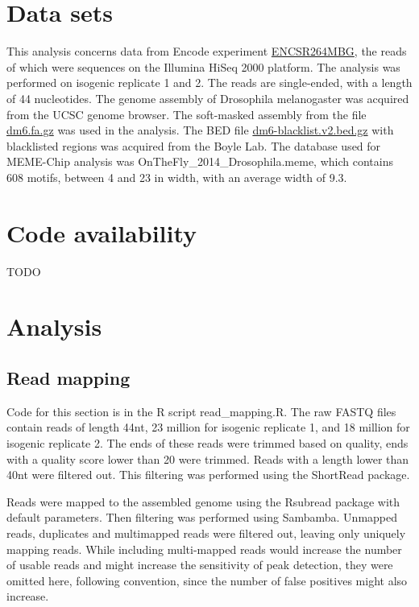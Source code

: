 \documentclass{article}
\begin{document}
\section{Data sets}
This analysis concerns data from Encode experiment \href{https://www.encodeproject.org/experiments/ENCSR264MBG/}{ENCSR264MBG}, the reads of which were sequences on the Illumina HiSeq 2000 platform. The analysis was performed on isogenic replicate 1 and 2. The reads are single-ended, with a length of 44 nucleotides. The genome assembly of Drosophila melanogaster was acquired from the UCSC genome browser\cite{karolchik2003ucsc}. The soft-masked assembly from the file \href{https://hgdownload.soe.ucsc.edu/goldenPath/dm6/bigZips/}{dm6.fa.gz} was used in the analysis. The BED file \href{https://github.com/Boyle-Lab/Blacklist}{dm6-blacklist.v2.bed.gz} with blacklisted regions was acquired from the Boyle Lab\cite{amemiya2019encode}. The database used for MEME-Chip analysis was OnTheFly_2014_Drosophila.meme\cite{shazman2014onthefly}, which contains 608 motifs, between 4 and 23 in width, with an average width of 9.3. 

\section{Code availability}
TODO

\section{Analysis}

\subsection{Read mapping}

Code for this section is in the R script read\_mapping.R. The raw FASTQ files contain reads of length 44nt, 23 million for isogenic replicate 1, and 18 million for isogenic replicate 2. The ends of these reads were trimmed based on quality, ends with a quality score lower than 20 were trimmed. Reads with a length lower than 40nt were filtered out. This filtering was performed using the ShortRead package\cite{morgan2009shortread}.

Reads were mapped to the assembled genome using the Rsubread package\cite{liao2019r} with default parameters. Then filtering was performed using Sambamba\cite{tarasov2015sambamba}. Unmapped reads, duplicates and multimapped reads were filtered out, leaving only uniquely mapping reads. While including multi-mapped reads would increase the number of usable reads and might increase the sensitivity of peak detection, they were omitted here, following convention, since the number of false positives might also increase\cite{chung2011discovering}.
\end{document}
